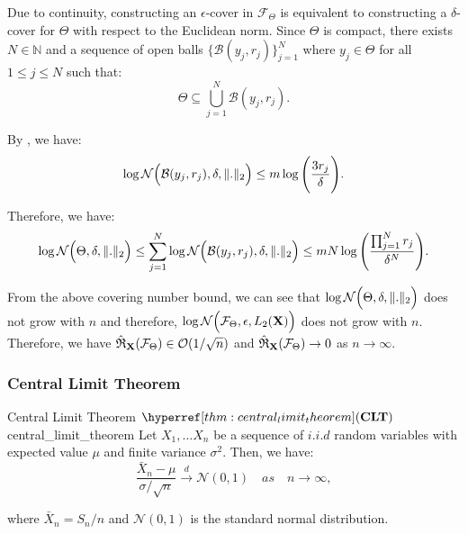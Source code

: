 \begin{proof*}
    \noindent Due to continuity, constructing an $\epsilon$-cover in $\mathcal{F}_\Theta$ is equivalent to constructing a $\delta$-cover for $\Theta$ with respect to the Euclidean norm. Since $\Theta$ is compact, there exists $N\in\mathbb{N}$ and a sequence of open balls $\{\mathcal{B}(y_j, r_j)\}_{j=1}^N$ where $y_j\in\Theta$ for all $1\le j \le N$ such that:
    \begin{equation}
        \Theta \subseteq \bigcup_{j=1}^N \mathcal{B}(y_j, r_j).
    \end{equation}

    \noindent By \cite[Lemma A.8]{article:long2020}, we have:
    \begin{equation}
        \log \mathcal{N}\Big( \mathcal{B}(y_j, r_j), \delta, \|.\|_2 \Big) \le m \log \Bigg( \frac{3r_j}{\delta} \Bigg).
    \end{equation}

    \noindent Therefore, we have:
    \begin{equation}
        \log\mathcal{N}\Big( \Theta, \delta, \|.\|_2 \Big) \le \sum_{j=1}^N \log \mathcal{N}\Big( \mathcal{B}(y_j, r_j), \delta, \|.\|_2 \Big) \le mN\log\Bigg( \frac{\prod_{j=1}^N r_j}{\delta^N} \Bigg).
    \end{equation}

    \noindent From the above covering number bound, we can see that $\log\mathcal{N}\Big( \Theta, \delta, \|.\|_2 \Big)$ does not grow with $n$ and therefore, $\log\mathcal{N}\Big( \mathcal{F}_\Theta, \epsilon, L_2({\bf X}) \Big)$ does not grow with $n$. Therefore, we have $\mathfrak{\hat R}_{{\bf X}}(\mathcal{F}_\Theta) \in \mathcal{O}(1/\sqrt{n})$ and $\mathfrak{\hat R}_{{\bf X}}(\mathcal{F}_\Theta)\to 0$ as $n\to\infty$.
\end{proof*} 

\subsubsection{Central Limit Theorem}
\begin{theorem}{Central Limit Theorem $\CLT$}{central_limit_theorem}
    Let $X_1, \dots X_n$ be a sequence of $i.i.d$ random variables with expected value $\mu$ and finite variance $\sigma^2$. Then, we have:
    \begin{equation}
        \frac{\bar X_n - \mu}{\sigma/\sqrt{n}} \xrightarrow{d} \mathcal{N}(0, 1) \quad as \quad n \to \infty,
    \end{equation}

    \noindent where $\bar X_n = S_n/n$ and $\mathcal{N}(0,1)$ is the standard normal distribution.
\end{theorem}

